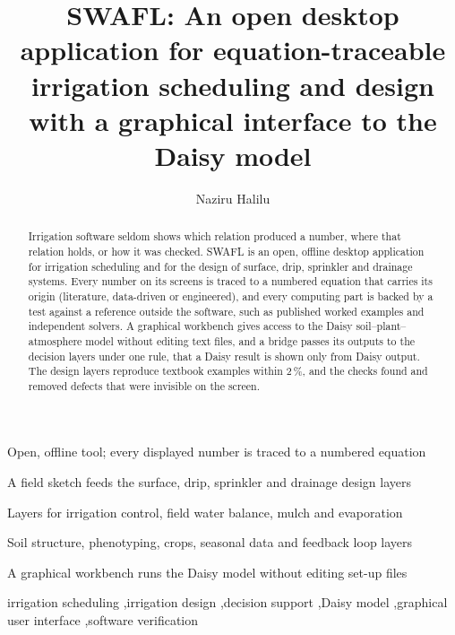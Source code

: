\documentclass[preprint,12pt]{elsarticle}
\begin{document}
\begin{frontmatter}
\title{SWAFL: An open desktop application for equation-traceable irrigation scheduling and design with a graphical interface to the Daisy model}

\author[aua,upna]{Naziru Halilu}

\begin{abstract}
Irrigation software seldom shows which relation produced a number, where that relation holds, or how it was checked. SWAFL is an open, offline desktop application for irrigation scheduling and for the design of surface, drip, sprinkler and drainage systems. Every number on its screens is traced to a numbered equation that carries its origin (literature, data-driven or engineered), and every computing part is backed by a test against a reference outside the software, such as published worked examples and independent solvers. A graphical workbench gives access to the Daisy soil--plant--atmosphere model without editing text files, and a bridge passes its outputs to the decision layers under one rule, that a Daisy result is shown only from Daisy output. The design layers reproduce textbook examples within 2\,\%, and the checks found and removed defects that were invisible on the screen.
\end{abstract}

\begin{highlights}
\item Open, offline tool; every displayed number is traced to a numbered equation
\item A field sketch feeds the surface, drip, sprinkler and drainage design layers
\item Layers for irrigation control, field water balance, mulch and evaporation
\item Soil structure, phenotyping, crops, seasonal data and feedback loop layers
\item A graphical workbench runs the Daisy model without editing set-up files
\end{highlights}

\begin{keyword}
irrigation scheduling \sep irrigation design \sep decision support \sep Daisy model \sep graphical user interface \sep software verification
\end{keyword}
\end{frontmatter}
\end{document}
